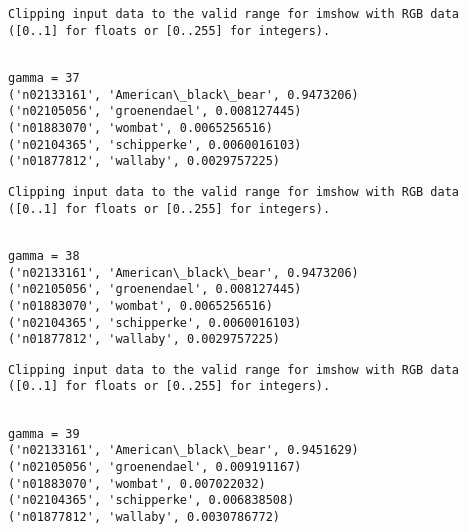 \documentclass[11pt]{article}
\begin{document}
    \begin{Verbatim}[commandchars=\\\{\}]
Clipping input data to the valid range for imshow with RGB data ([0..1] for floats or [0..255] for integers).

    \end{Verbatim}

    \begin{Verbatim}[commandchars=\\\{\}]

gamma = 37
('n02133161', 'American\_black\_bear', 0.9473206)
('n02105056', 'groenendael', 0.008127445)
('n01883070', 'wombat', 0.0065256516)
('n02104365', 'schipperke', 0.0060016103)
('n01877812', 'wallaby', 0.0029757225)

    \end{Verbatim}

    \begin{Verbatim}[commandchars=\\\{\}]
Clipping input data to the valid range for imshow with RGB data ([0..1] for floats or [0..255] for integers).

    \end{Verbatim}

    \begin{Verbatim}[commandchars=\\\{\}]

gamma = 38
('n02133161', 'American\_black\_bear', 0.9473206)
('n02105056', 'groenendael', 0.008127445)
('n01883070', 'wombat', 0.0065256516)
('n02104365', 'schipperke', 0.0060016103)
('n01877812', 'wallaby', 0.0029757225)

    \end{Verbatim}

    \begin{Verbatim}[commandchars=\\\{\}]
Clipping input data to the valid range for imshow with RGB data ([0..1] for floats or [0..255] for integers).

    \end{Verbatim}

    \begin{Verbatim}[commandchars=\\\{\}]

gamma = 39
('n02133161', 'American\_black\_bear', 0.9451629)
('n02105056', 'groenendael', 0.009191167)
('n01883070', 'wombat', 0.007022032)
('n02104365', 'schipperke', 0.006838508)
('n01877812', 'wallaby', 0.0030786772)

    \end{Verbatim}
\end{document}
